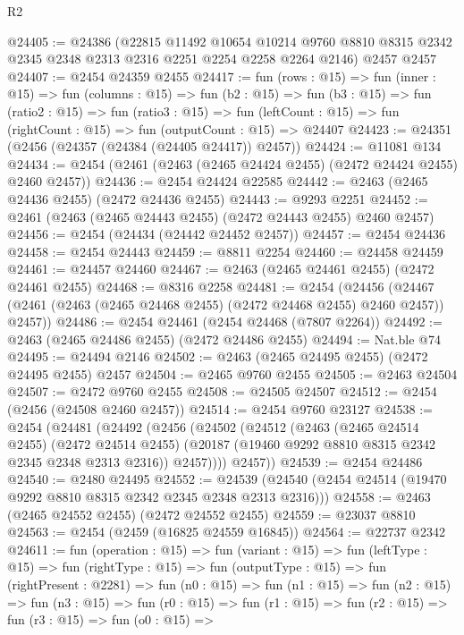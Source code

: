 \begin{lexlean}{R2}
\begin{coremodule}
@24405 := @24386
    (@22815
      @11492
      @10654
      @10214
      @9760
      @8810
      @8315
      @2342
      @2345
      @2348
      @2313
      @2316
      @2251
      @2254
      @2258
      @2264
      @2146)
    @2457
    @2457
@24407 := @2454 @24359 @2455
@24417 := fun (rows : @15) =>
  fun (inner : @15) =>
  fun (columns : @15) =>
  fun (b2 : @15) =>
  fun (b3 : @15) =>
  fun (ratio2 : @15) =>
  fun (ratio3 : @15) =>
  fun (leftCount : @15) => fun (rightCount : @15) => fun (outputCount : @15) => @24407
@24423 := @24351 (@2456 (@24357 (@24384 (@24405 @24417)) @2457))
@24424 := @11081 @134
@24434 := @2454 (@2461 (@2463 (@2465 @24424 @2455) (@2472 @24424 @2455) @2460 @2457))
@24436 := @2454 @24424 @22585
@24442 := @2463 (@2465 @24436 @2455) (@2472 @24436 @2455)
@24443 := @9293 @2251
@24452 := @2461 (@2463 (@2465 @24443 @2455) (@2472 @24443 @2455) @2460 @2457)
@24456 := @2454 (@24434 (@24442 @24452 @2457))
@24457 := @2454 @24436
@24458 := @2454 @24443
@24459 := @8811 @2254
@24460 := @24458 @24459
@24461 := @24457 @24460
@24467 := @2463 (@2465 @24461 @2455) (@2472 @24461 @2455)
@24468 := @8316 @2258
@24481 := @2454
    (@24456 (@24467 (@2461 (@2463 (@2465 @24468 @2455) (@2472 @24468 @2455) @2460 @2457)) @2457))
@24486 := @2454 @24461 (@2454 @24468 (@7807 @2264))
@24492 := @2463 (@2465 @24486 @2455) (@2472 @24486 @2455)
@24494 := Nat.ble @74
@24495 := @24494 @2146
@24502 := @2463 (@2465 @24495 @2455) (@2472 @24495 @2455) @2457
@24504 := @2465 @9760 @2455
@24505 := @2463 @24504
@24507 := @2472 @9760 @2455
@24508 := @24505 @24507
@24512 := @2454 (@2456 (@24508 @2460 @2457))
@24514 := @2454 @9760 @23127
@24538 := @2454
    (@24481
      (@24492
        (@2456
          (@24502
            (@24512
              (@2463
                (@2465 @24514 @2455)
                (@2472 @24514 @2455)
                (@20187 (@19460 @9292 @8810 @8315 @2342 @2345 @2348 @2313 @2316))
                @2457))))
        @2457))
@24539 := @2454 @24486
@24540 := @2480 @24495
@24552 := @24539 (@24540 (@2454 @24514 (@19470 @9292 @8810 @8315 @2342 @2345 @2348 @2313 @2316)))
@24558 := @2463 (@2465 @24552 @2455) (@2472 @24552 @2455)
@24559 := @23037 @8810
@24563 := @2454 (@2459 (@16825 @24559 @16845))
@24564 := @22737 @2342
@24611 := fun (operation : @15) =>
  fun (variant : @15) =>
  fun (leftType : @15) =>
  fun (rightType : @15) =>
  fun (outputType : @15) =>
  fun (rightPresent : @2281) =>
  fun (n0 : @15) =>
  fun (n1 : @15) =>
  fun (n2 : @15) =>
  fun (n3 : @15) =>
  fun (r0 : @15) =>
  fun (r1 : @15) =>
  fun (r2 : @15) =>
  fun (r3 : @15) =>
  fun (o0 : @15) =>

\end{coremodule}
\end{lexlean}
